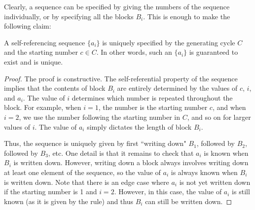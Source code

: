\documentclass[runningheads,a4paper]{llncs}
\begin{document}
Clearly, a sequence can be specified by giving the numbers of the sequence individually, or by specifying all the blocks $B_i$. This is enough to make the following claim:

\begin{proposition}
A self-referencing sequence $\{a_i\}$ is uniquely specified by the generating cycle $C$ and the starting number $c \in C$. In other words, such an $\{a_i\}$ is guaranteed to exist and is unique.
\end{proposition}
\begin{proof} 
The proof is constructive. The self-referential property of the sequence implies that the contents of block $B_i$ are entirely determined by the values of $c$, $i$, and $a_i$. The value of $i$ determines which number is repeated throughout the block. For example, when $i = 1$, the number is the starting number $c$, and when $i = 2$, we use the number following the starting number in $C$, and so on for larger values of $i$. The value of $a_i$ simply dictates the length of block $B_i$.

Thus, the sequence is uniquely given by first ``writing down" $B_1$, followed by $B_2$, followed by $B_3$, etc. One detail is that it remains to check that $a_i$ is known when $B_i$ is written down. However, writing down a block always involves writing down at least one element of the sequence, so the value of $a_i$ is always known when $B_i$ is written down. Note that there is an edge case where $a_i$ is not yet written down if the starting number is 1 and $i =2$. However, in this case, the value of $a_i$ is still known (as it is given by the rule) and thus $B_i$ can still be written down.
\end{proof}
%
%
\end{document}
